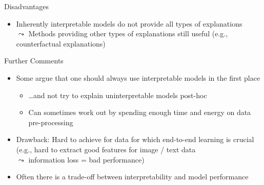\documentclass[11pt,compress,t,notes=noshow, aspectratio=169, xcolor=table]{beamer}
\begin{document}
\begin{frame}{Disadvantages}
\begin{itemize}
     \item<4-> Inherently interpretable models do not provide all types of explanations
     \\
     $\leadsto$ Methods providing other types of explanations still useful (e.g., counterfactual explanations)
\end{itemize}
\end{frame}

\begin{frame}{Further Comments}

    \begin{itemize}
        \item<1-> Some argue that one should always use interpretable models in the first place 
        \begin{itemize}
            \item \ldots and not try to explain uninterpretable models post-hoc
            \item Can sometimes work out by spending enough time and energy on data pre-processing %
        \end{itemize}
       \item<2->[$\leadsto$] Drawback: Hard to achieve for data for which end-to-end learning is crucial\\ 
        (e.g., hard to extract good features for image / text data\\ $\leadsto$ information loss = bad performance)
        \item<3-> Often there is a trade-off between interpretability and model performance 
    \end{itemize}
    

\end{frame}
\end{document}
